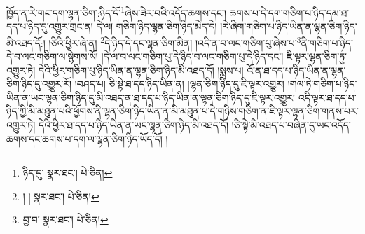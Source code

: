 ཁྱོད་ན་རེ་གང་དག་ལྷན་ཅིག་:ཉིད་དོ་\footnote{ཉིད་དུ་  སྣར་ཐང་།  པེ་ཅིན། }ཞེས་ཟེར་བའི་འདོད་ཆགས་དང་། ཆགས་པ་དེ་དག་གཅིག་པ་ཉིད་དམ་ཐ་དད་པ་ཉིད་དུ་འགྱུར་གྲང་ན། དེ་ལ། གཅིག་ཉིད་ལྷན་ཅིག་ཉིད་མེད་དེ། །རེ་ཞིག་གཅིག་པ་ཉིད་ཡིན་ན་ལྷན་ཅིག་ཉིད་མི་འཐད་དོ:། །ཅིའི་ཕྱིར་ཞེ་ན། \footnote{། །   སྣར་ཐང་།  པེ་ཅིན། }དེ་ཉིད་དེ་དང་ལྷན་ཅིག་མིན། །འདི་ན་བ་ལང་གཅིག་པུ་ཞེས་པ་\footnote{བྱ་བ་  སྣར་ཐང་།  པེ་ཅིན། }ནི་གཅིག་པ་ཉིད་དེ་བ་ལང་གཅིག་ལ་སྙེགས་སོ། །དེ་ལ་བ་ལང་གཅིག་པུ་དེ་ཉིད་བ་ལང་གཅིག་པུ་དེ་ཉིད་དང་། ཇི་ལྟར་ལྷན་ཅིག་ཏུ་འགྱུར་ཏེ། དེའི་ཕྱིར་གཅིག་པུ་ཉིད་ཡིན་ན་ལྷན་ཅིག་ཉིད་མི་འཐད་དོ། །སྨྲས་པ། འོ་ན་ཐ་དད་པ་ཉིད་ཡིན་ན་ལྷན་ཅིག་ཉིད་དུ་འགྱུར་རོ། །བཤད་པ། ཅི་སྟེ་ཐ་དད་ཉིད་ཡིན་ན། །ལྷན་ཅིག་ཉིད་དུ་ཇི་ལྟར་འགྱུར། །གལ་ཏེ་གཅིག་པ་ཉིད་ཡིན་ན་ཡང་ལྷན་ཅིག་ཉིད་དུ་མི་འཐད་ན་ཐ་དད་པ་ཉིད་ཡིན་ན་ལྷན་ཅིག་ཉིད་དུ་ཇི་ལྟར་འགྱུར། འདི་ལྟར་ཐ་དད་པ་ཉིད་ཀྱི་མི་མཐུན་པའི་ཕྱོགས་ནི་ལྷན་ཅིག་ཉིད་ཡིན་ན་མི་མཐུན་པ་དེ་གཉིས་གཅིག་ན་ཇི་ལྟར་ལྷན་ཅིག་གནས་པར་འགྱུར་ཏེ། དེའི་ཕྱིར་ཐ་དད་པ་ཉིད་ཡིན་ན་ཡང་ལྷན་ཅིག་ཉིད་མི་འཐད་དོ། །ཅི་སྟེ་མི་འཐད་པ་བཞིན་དུ་ཡང་འདོད་ཆགས་དང་ཆགས་པ་དག་ལ་ལྷན་ཅིག་ཉིད་ཡོད་དོ། །
